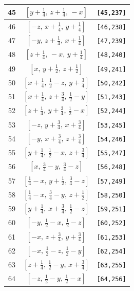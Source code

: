 \documentclass[fleqn,8pt]{jsarticle}
\begin{document}
\begin{longtable}{ccc}
45 & $\left[ y + \frac{1}{4},\, z + \frac{1}{4},\, - x \right]$ & {\tt [45,237]} \\ \hline
46 & $\left[ - z,\, x + \frac{1}{4},\, y + \frac{1}{4} \right]$ & {\tt [46,238]} \\ \hline
47 & $\left[ - y,\, z + \frac{1}{4},\, x + \frac{1}{4} \right]$ & {\tt [47,239]} \\ \hline
48 & $\left[ z + \frac{1}{4},\, - x,\, y + \frac{1}{4} \right]$ & {\tt [48,240]} \\ \hline
49 & $\left[ x,\, y + \frac{1}{2},\, z + \frac{1}{2} \right]$ & {\tt [49,241]} \\ \hline
50 & $\left[ x + \frac{1}{4},\, \frac{1}{2} - z,\, y + \frac{3}{4} \right]$ & {\tt [50,242]} \\ \hline
51 & $\left[ x + \frac{1}{4},\, z + \frac{3}{4},\, \frac{1}{2} - y \right]$ & {\tt [51,243]} \\ \hline
52 & $\left[ z + \frac{1}{4},\, y + \frac{3}{4},\, \frac{1}{2} - x \right]$ & {\tt [52,244]} \\ \hline
53 & $\left[ - z,\, y + \frac{3}{4},\, x + \frac{3}{4} \right]$ & {\tt [53,245]} \\ \hline
54 & $\left[ - y,\, x + \frac{3}{4},\, z + \frac{3}{4} \right]$ & {\tt [54,246]} \\ \hline
55 & $\left[ y + \frac{1}{4},\, \frac{1}{2} - x,\, z + \frac{3}{4} \right]$ & {\tt [55,247]} \\ \hline
56 & $\left[ x,\, \frac{3}{4} - y,\, \frac{3}{4} - z \right]$ & {\tt [56,248]} \\ \hline
57 & $\left[ \frac{1}{4} - x,\, y + \frac{1}{2},\, \frac{3}{4} - z \right]$ & {\tt [57,249]} \\ \hline
58 & $\left[ \frac{1}{4} - x,\, \frac{3}{4} - y,\, z + \frac{1}{2} \right]$ & {\tt [58,250]} \\ \hline
59 & $\left[ y + \frac{1}{4},\, x + \frac{3}{4},\, \frac{1}{2} - z \right]$ & {\tt [59,251]} \\ \hline
60 & $\left[ - y,\, \frac{1}{2} - x,\, \frac{1}{2} - z \right]$ & {\tt [60,252]} \\ \hline
61 & $\left[ - x,\, z + \frac{3}{4},\, y + \frac{3}{4} \right]$ & {\tt [61,253]} \\ \hline
62 & $\left[ - x,\, \frac{1}{2} - z,\, \frac{1}{2} - y \right]$ & {\tt [62,254]} \\ \hline
63 & $\left[ z + \frac{1}{4},\, \frac{1}{2} - y,\, x + \frac{3}{4} \right]$ & {\tt [63,255]} \\ \hline
64 & $\left[ - z,\, \frac{1}{2} - y,\, \frac{1}{2} - x \right]$ & {\tt [64,256]} \\ \hline

\end{longtable}
\end{document}
